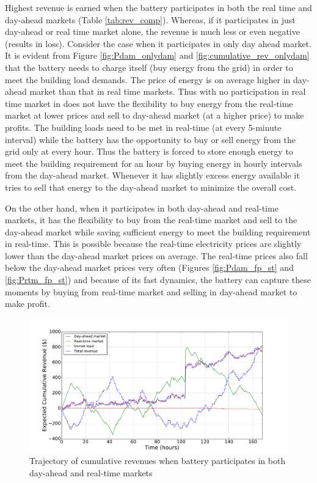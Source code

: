 \documentclass[11pt,twoside]{article}
\begin{document}
Highest revenue is earned when the battery participates in both the real time and day-ahead markets (Table \ref{tab:rev_comp}). Whereas, if it participates in just day-ahead or real time market alone, the revenue is much less or even negative (results in loss). Consider the case when it participates in only day ahead market. It is evident from Figure \ref{fig:Pdam_onlydam} and \ref{fig:cumulative_rev_onlydam} that the battery needs to charge itself (buy energy from the grid) in order to meet the building load demands. The price of energy is on average higher in day-ahead market than that in real time markets. Thus with no participation in real time market in does not have the flexibility to buy energy from the real-time market at lower prices and sell to day-ahead market (at a higher price) to make profits. The building loads need to be met in real-time (at every 5-minute interval) while the battery has the opportunity to buy or sell energy from the grid only at every hour. Thus the battery is forced to store enough energy to meet the building requirement for an hour by buying energy in hourly intervals from the day-ahead market. Whenever it has slightly excess energy available it tries to sell that energy to the day-ahead market to minimize the overall cost. 

On the other hand, when it participates in both day-ahead and real-time markets, it has the flexibility to buy from the real-time market and sell to the day-ahead market while saving sufficient energy to meet the building requirement in real-time. This is possible because the real-time electricity prices are slightly lower than the day-ahead market prices on average. The real-time prices also fall below the day-ahead market prices very often (Figures \ref{fig:Pdam_fp_st} and \ref{fig:Prtm_fp_st}) and because of its fast dynamics, the battery can capture these moments by buying from real-time market and selling in day-ahead market to make profit. 

\begin{figure}[h!]
\begin{center}
\includegraphics[scale=0.4]{Figures/Plots/fullproblem_stoch/cumulative_rev_fp_st.pdf} \caption{Trajectory of cumulative revenues when battery participates in both day-ahead and real-time markets}\label{fig:cumulative_rev_fp_st}\end{center}
\end{figure}
\end{document}

